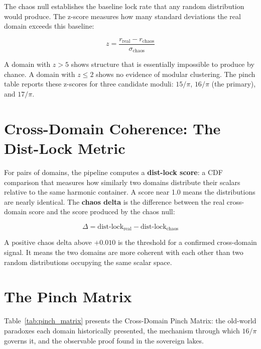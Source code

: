 \documentclass[11pt, letterpaper, openany]{book}
\begin{document}
The chaos null establishes the baseline lock rate that any random distribution would produce.
The z-score measures how many standard deviations the real domain exceeds this baseline:

\[
z = \frac{r_{\text{real}} - r_{\text{chaos}}}{\sigma_{\text{chaos}}}
\]

A domain with $z > 5$ shows structure that is essentially impossible to produce by chance.
A domain with $z \leq 2$ shows no evidence of modular clustering. The pinch table reports these
z-scores for three candidate moduli: $15/\pi$, $16/\pi$ (the primary), and $17/\pi$.

\section*{Cross-Domain Coherence: The Dist-Lock Metric}
For pairs of domains, the pipeline computes a \textbf{dist-lock score}: a CDF comparison that
measures how similarly two domains distribute their scalars relative to the same harmonic
container. A score near 1.0 means the distributions are nearly identical. The \textbf{chaos delta}
is the difference between the real cross-domain score and the score produced by the chaos null:

\[
\Delta = \text{dist-lock}_{\text{real}} - \text{dist-lock}_{\text{chaos}}
\]

A positive chaos delta above $+0.010$ is the threshold for a confirmed cross-domain signal.
It means the two domains are more coherent with each other than two random distributions
occupying the same scalar space.

\section*{The Pinch Matrix}
Table~\ref{tab:pinch_matrix} presents the Cross-Domain Pinch Matrix: the old-world paradoxes
each domain historically presented, the mechanism through which $16/\pi$ governs it, and the
observable proof found in the sovereign lakes.
\end{document}
